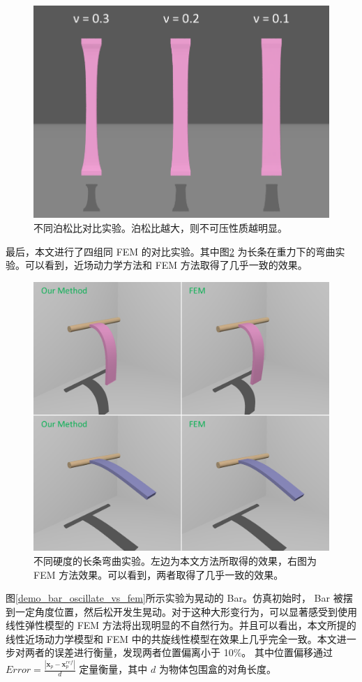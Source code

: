 \begin{figure}[!htb]
  \centering
  \captionsetup{justification=centering}
  \includegraphics[width=0.7\linewidth]{chap/image/compare_different_poisson_ratio}

  \caption{\label{compare_different_poisson_ratio}
           不同泊松比对比实验。泊松比越大，则不可压性质越明显。
          }
\end{figure}

最后，本文进行了四组同 FEM 的对比实验。其中图\ref{demo_strip_vs_fem} 为长条在重力下的弯曲实验。可以看到，近场动力学方法和 FEM 方法取得了几乎一致的效果。

\begin{figure}[!htb]
  \centering
  \captionsetup{justification=centering}
  \includegraphics[width=0.7\linewidth]{chap/image/demo_strip_vs_fem}

  \caption{\label{demo_strip_vs_fem}
           不同硬度的长条弯曲实验。左边为本文方法所取得的效果，右图为 FEM 方法效果。可以看到，两者取得了几乎一致的效果。
          }
\end{figure}

图\ref{demo_bar_oscillate_vs_fem}所示实验为晃动的 Bar。仿真初始时， Bar 被摆到一定角度位置，然后松开发生晃动。对于这种大形变行为，可以显著感受到使用线性弹性模型的 FEM 方法将出现明显的不自然行为。并且可以看出，本文所提的线性近场动力学模型和 FEM 中的共旋线性模型在效果上几乎完全一致。本文进一步对两者的误差进行衡量，发现两者位置偏离小于 10\%。 其中位置偏移通过 $Error = \frac{|\bm{x}_p-\bm{x}_p^{ref}|}{d}$ 定量衡量，其中 $d$ 为物体包围盒的对角长度。

